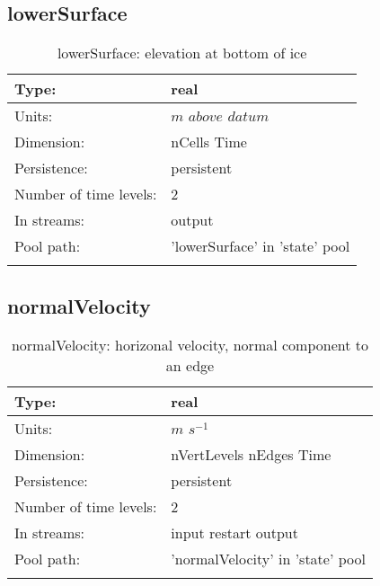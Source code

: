\subsection[lowerSurface]{lowerSurface}
\label{subsec:var_sec_state_lowerSurface}
\begin{center}
\begin{longtable}{| p{2.0in} | p{4.0in} |}
        \hline 
        Type: & real \\
        \hline 
        Units: & $m$ $above$ $datum$ \\
        \hline 
        Dimension: & nCells Time \\
        \hline 
        Persistence: & persistent \\
        \hline 
        Number of time levels: & 2 \\
        \hline 
		 In streams: &  output \\
        \hline 
            Pool path: & 'lowerSurface' in 'state' pool
 \\
		 \hline 
    \caption{lowerSurface: elevation at bottom of ice}
\end{longtable}
\end{center}
\subsection[normalVelocity]{normalVelocity}
\label{subsec:var_sec_state_normalVelocity}
\begin{center}
\begin{longtable}{| p{2.0in} | p{4.0in} |}
        \hline 
        Type: & real \\
        \hline 
        Units: & $m$ $s^{-1}$ \\
        \hline 
        Dimension: & nVertLevels nEdges Time \\
        \hline 
        Persistence: & persistent \\
        \hline 
        Number of time levels: & 2 \\
        \hline 
		 In streams: &  input restart output \\
        \hline 
            Pool path: & 'normalVelocity' in 'state' pool
 \\
		 \hline 
    \caption{normalVelocity: horizonal velocity, normal component to an edge}
\end{longtable}
\end{center}
